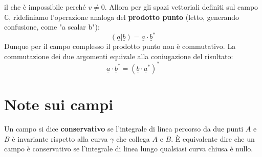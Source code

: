 \documentclass{book}
\begin{document}
    il che è impossibile perché $v \neq 0$. Allora per gli spazi vettoriali definiti sul campo $\mathbb{C}$, ridefiniamo l'operazione analoga del \textbf{prodotto punto} (letto, generando confusione, come "a scalar b"):
    \begin{equation*}
        (\underline{a}|\underline{b}) = \underline{a} \cdot \underline{b}^{*}
    \end{equation*}
    Dunque per il campo complesso il prodotto punto non è commutativo. La commutazione dei due argomenti equivale alla coniugazione del risultato:
    \begin{equation}
        \underline{a} \cdot \underline{b}^{*} = (\underline{b} \cdot\underline{a}^{*})^{*}
    \end{equation}
    \section*{Note sui campi}
        Un campo si dice \textbf{conservativo} se l'integrale di linea percorso da due punti $A$ e $B$
        è invariante rispetto alla curva $\gamma$ che collega $A$ e $B$. È equivalente dire che un campo è conservativo
        se l'integrale di linea lungo qualsiasi curva chiusa è nullo. 
\end{document}

